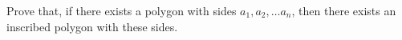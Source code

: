 Prove that, if there exists a polygon with sides $a_1, a_2, \ldots a_n$, then there exists an inscribed polygon with these sides.
